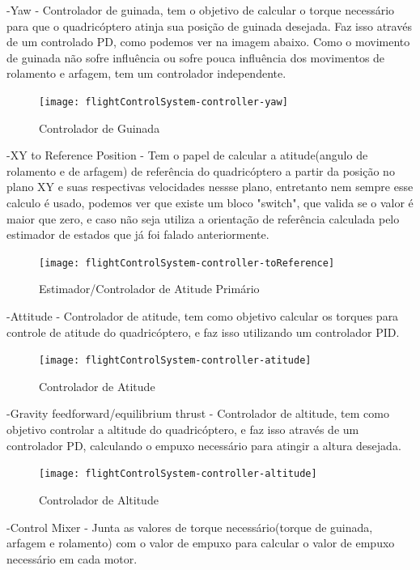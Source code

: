 -Yaw - Controlador de guinada, tem o objetivo de calcular o torque necessário para que o quadricóptero atinja sua posição de guinada desejada. Faz isso através de um controlado PD, como podemos ver na imagem abaixo. Como o movimento de guinada não sofre influência ou sofre pouca influência dos movimentos de rolamento e arfagem, tem um controlador independente.

\begin{figure}[H]
	\centering
	\texttt{[image: flightControlSystem-controller-yaw]}
	\caption{Controlador de Guinada}
	\centering
	\label{Controlador de Guinada}
\end{figure}

-XY to Reference Position - Tem o papel de calcular a atitude(angulo de rolamento e de arfagem) de referência do quadricóptero a partir da posição no plano XY e suas respectivas velocidades nessse plano, entretanto nem sempre esse calculo é usado, podemos ver que existe um bloco "switch", que valida se o valor é maior que zero, e caso não seja utiliza a orientação de referência calculada pelo estimador de estados que já foi falado anteriormente.

\begin{figure}[H]
	\centering
	\texttt{[image: flightControlSystem-controller-toReference]}
	\caption{Estimador/Controlador de Atitude Primário}
	\centering
	\label{Estimador de Atitude}
\end{figure}

-Attitude - Controlador de atitude, tem como objetivo calcular os torques para controle de atitude do quadricóptero, e faz isso utilizando um controlador PID.

\begin{figure}[H]
	\centering
	\texttt{[image: flightControlSystem-controller-atitude]}
	\caption{Controlador de Atitude}
	\centering
	\label{Controlador de Atitude}
\end{figure}


-Gravity feedforward/equilibrium thrust - Controlador de altitude,  tem como objetivo controlar a altitude do quadricóptero, e faz isso através de um controlador PD, calculando o empuxo necessário para atingir a altura desejada.

\begin{figure}[H]
	\centering
	\texttt{[image: flightControlSystem-controller-altitude]}
	\caption{Controlador de Altitude}
	\centering
	\label{Controlador de Altitude}
\end{figure}

-Control Mixer - Junta as valores de torque necessário(torque de guinada, arfagem e rolamento) com o valor de empuxo para calcular o valor de empuxo necessário em cada motor. 

